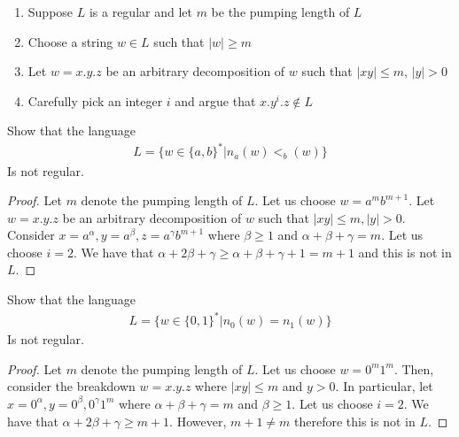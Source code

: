 \documentclass[a4paper]{article}
\theoremstyle{plain}
\theoremstyle{definition}
\newtheorem{defn}{Definition}[section]
\newtheorem{exmp}{Example}[section]
\theoremstyle{remark}
\begin{document}
\begin{tcolorbox}[colback=black!3!white,colframe=black!60!white,title=\begin{defn}Steps for showing non-regularity \label{Steps for showing non-regularity}\end{defn}]
\begin{enumerate}
	\item Suppose $L$ is a regular and let $m$ be the pumping length of $L$ 
	\item Choose a string $w \in L$ such that $|w| \ge m$ 
	\item Let $w = x.y.z$ be an arbitrary decomposition of $w$ such that $|xy|\le m$, $|y|>0$ 
	\item Carefully pick an integer $i$ and argue that $x.y^{i}.z \not\in L$
\end{enumerate}
\end{tcolorbox}
\begin{tcolorbox}[colback=black!3!white,colframe=black!60!white,title=\begin{exmp}Pumping Lemma Example \label{Pumping Lemma Example}\end{exmp}]
        Show that the language
                \begin{align}
                L = \{w \in \{a,b\}^{*} | n_a(w)<_b(w) \}
                \end{align}
		Is not regular.
		\begin{proof}
			Let $m$ denote the pumping length of $L$. Let us choose $w = a^{m}b^{m+1}$. Let $w=x.y.z$ be an arbitrary decomposition of $w$ such that $|xy|\le m, |y|>0$. Consider $x=a^{\alpha}, y=a^{\beta},z=a^{\gamma}b^{m+1}$ where $\beta \ge 1$ and $\alpha+\beta+\gamma = m$. Let us choose $i=2$. We have that $\alpha+2\beta+\gamma \ge \alpha + \beta + \gamma +1 = m+1$ and this is not in $L$.
		\end{proof}
\end{tcolorbox}
\begin{tcolorbox}[colback=black!3!white,colframe=black!60!white,title=\begin{exmp}Pumping Lemma Example Two \label{Pumping Lemma Example Two}\end{exmp}]
Show that the language
\begin{align}
	L = \{ w\in\{0,1\}^{*} | n_0(w) = n_1(w)\}
\end{align}
Is not regular.
\begin{proof}
        Let $m$ denote the pumping length of $L$. Let us choose $w=0^{m}1^{m}$. Then, consider the breakdown $w=x.y.z$ where $|xy| \le m$ and $y > 0$. In particular, let $x=0^{\alpha},y=0^{\beta},0^{\gamma}1^{m}$ where $\alpha+\beta+\gamma = m$ and $\beta \ge 1$. Let us choose $i=2$. We have that $\alpha+2\beta+\gamma \ge m+1$. However, $m+1 \neq m$ therefore this is not in $L$.
\end{proof}
\end{tcolorbox}
\end{document}
